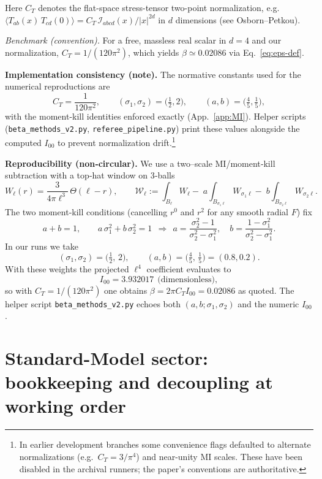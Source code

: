 \documentclass[aps,prd,onecolumn,superscriptaddress,nofootinbib]{revtex4-2}
\begin{document}
\noindent Here \(C_T\) denotes the flat-space stress-tensor two-point normalization, e.g.
\(\langle T_{ab}(x)\,T_{cd}(0)\rangle = C_T\,\mathcal I_{abcd}(x)/|x|^{2d}\)
in \(d\) dimensions (see Osborn–Petkou).

\noindent\emph{Benchmark (convention).} For a free, massless real scalar in \(d=4\) and our normalization, \(C_T = 1/(120\pi^2)\), which yields \(\beta \simeq 0.02086\) via Eq.~\eqref{eq:eps-def}.

\noindent\textbf{Implementation consistency (note).} The normative constants used for the numerical reproductions are
\[
C_T=\frac{1}{120\pi^2},\qquad (\sigma_1,\sigma_2)=\Big(\tfrac{1}{2},2\Big),\qquad (a,b)=\Big(\tfrac{4}{5},\tfrac{1}{5}\Big),
\]
with the moment-kill identities enforced exactly (App.~\ref{app:MI}). Helper scripts (\texttt{beta\_methods\_v2.py}, \texttt{referee\_pipeline.py}) print these values alongside the computed \(I_{00}\) to prevent normalization drift.\footnote{In earlier development branches some convenience flags defaulted to alternate normalizations (e.g.\ \(C_T=3/\pi^4\)) and near-unity MI scales. These have been disabled in the archival runners; the paper’s conventions are authoritative.}

\noindent\textbf{Reproducibility (non‑circular).} We use a two–scale MI/moment‑kill subtraction with a top‑hat window on 3‑balls
\[
W_\ell(r)=\frac{3}{4\pi \ell^3}\,\Theta(\ell-r),\qquad
\mathcal{W}_\ell:=\int_{B_\ell}\!W_\ell-\;a\!\int_{B_{\sigma_1\ell}}\!W_{\sigma_1\ell}-\;b\!\int_{B_{\sigma_2\ell}}\!W_{\sigma_2\ell}.
\]
The two moment‑kill conditions (cancelling \(r^0\) and \(r^2\) for any smooth radial \(F\)) fix
\[
a+b=1,\qquad a\,\sigma_1^2+b\,\sigma_2^2=1
\ \ \Longrightarrow\ \
a=\frac{\sigma_2^2-1}{\sigma_2^2-\sigma_1^2},\quad
b=\frac{1-\sigma_1^2}{\sigma_2^2-\sigma_1^2}.
\]
In our runs we take
\[
(\sigma_1,\sigma_2)=\Big(\tfrac{1}{2},\,2\Big),\qquad (a,b)=\Big(\tfrac{4}{5},\,\tfrac{1}{5}\Big)=(0.8,0.2).
\]
With these weights the projected \(\ell^4\) coefficient evaluates to
\[
I_{00}=3.932017\ \ \text{(dimensionless)},
\]
so with \(C_T=1/(120\pi^2)\) one obtains \(\beta=2\pi C_T I_{00}=0.02086\) as quoted. The helper script \texttt{beta\_methods\_v2.py} echoes both \((a,b;\sigma_1,\sigma_2)\) and the numeric \(I_{00}\).

\section{Standard-Model sector: bookkeeping and decoupling at working order}
\label{sec:sm-link}
\end{document}
